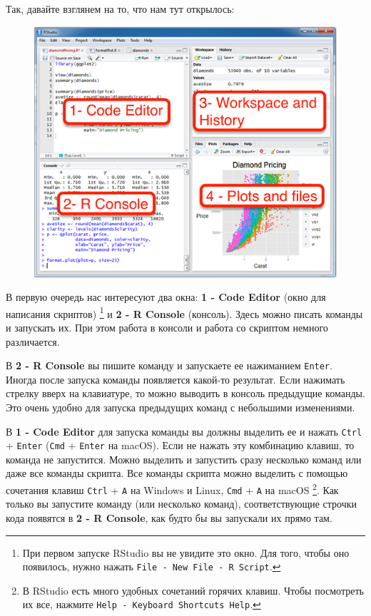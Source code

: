\documentclass[]{book}
\begin{document}
Так, давайте взглянем на то, что нам тут открылось:

\begin{figure}
\centering
\includegraphics{images/01_01_rstudio.png}
\caption{}
\end{figure}

В первую очередь нас интересуют два окна: \textbf{1 - Code Editor} (окно
для написания скриптов) \footnote{При первом запуске RStudio вы не
  увидите это окно. Для того, чтобы оно появилось, нужно нажать
  \texttt{File\ -\ New\ File\ -\ R\ Script}.} и \textbf{2 - R Console}
(консоль). Здесь можно писать команды и запускать их. При этом работа в
консоли и работа со скриптом немного различается.

В \textbf{2 - R Console} вы пишите команду и запускаете ее нажиманием
\texttt{Enter}. Иногда после запуска команды появляется какой-то
результат. Если нажимать стрелку вверх на клавиатуре, то можно выводить
в консоль предыдущие команды. Это очень удобно для запуска предыдущих
команд с небольшими изменениями.

В \textbf{1 - Code Editor} для запуска команды вы должны выделить ее и
нажать \texttt{Ctrl} + \texttt{Enter} (\texttt{Cmd} + \texttt{Enter} на
macOS). Если не нажать эту комбинацию клавиш, то команда не запустится.
Можно выделить и запустить сразу несколько команд или даже все команды
скрипта. Все команды скрипта можно выделить с помощью сочетания клавиш
\texttt{Ctrl} + \texttt{A} на Windows и Linux, \texttt{Cmd} + \texttt{A}
на macOS \footnote{В RStudio есть много удобных сочетаний горячих
  клавиш. Чтобы посмотреть их все, нажмите
  \texttt{Help\ -\ Keyboard\ Shortcuts\ Help}.}. Как только вы запустите
команду (или несколько команд), соответствующие строчки кода появятся в
\textbf{2 - R Console}, как будто бы вы запускали их прямо там.
\end{document}
